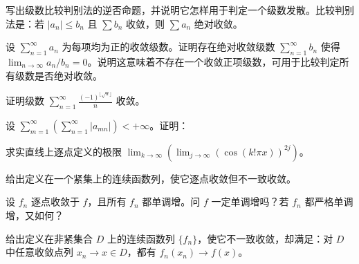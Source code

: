 \noindent\begin{minipage}{\textwidth}
写出级数比较判别法的逆否命题，并说明它怎样用于判定一个级数发散。比较判别法是：若 $|a_n|\le b_n$ 且 $\sum b_n$ 收敛，则 $\sum a_n$ 绝对收敛。
\end{minipage}\par\vfill
\noindent\begin{minipage}{\textwidth}
设 $\sum_{n=1}^{\infty}a_n$ 为每项均为正的收敛级数。证明存在绝对收敛级数 $\sum_{n=1}^{\infty}b_n$ 使得 $\lim_{n\to\infty}a_n/b_n=0$。说明这意味着不存在一个收敛正项级数，可用于比较判定所有级数是否绝对收敛。
\end{minipage}\par\vfill
\newpage
\noindent\begin{minipage}{\textwidth}
证明级数 $\displaystyle\sum_{n=1}^{\infty}\frac{(-1)^{\lfloor\sqrt n\rfloor}}n$ 收敛。
\end{minipage}\par\vfill
\noindent\begin{minipage}{\textwidth}
设 $\displaystyle\sum_{m=1}^{\infty}\left(\sum_{n=1}^{\infty}|a_{mn}|\right)<+\infty$。证明：
\end{minipage}\par\vfill
\noindent\begin{minipage}{\textwidth}
求实直线上逐点定义的极限 $\displaystyle\lim_{k\to\infty}\left(\lim_{j\to\infty}(\cos(k!\pi x))^{2j}\right)$。
\end{minipage}\par\vfill
\noindent\begin{minipage}{\textwidth}
给出定义在一个紧集上的连续函数列，使它逐点收敛但不一致收敛。
\end{minipage}\par\vfill
\newpage
\noindent\begin{minipage}{\textwidth}
设 $f_n$ 逐点收敛于 $f$，且所有 $f_n$ 都单调增。问 $f$ 一定单调增吗？若 $f_n$ 都严格单调增，又如何？
\end{minipage}\par\vfill
\noindent\begin{minipage}{\textwidth}
给出定义在非紧集合 $D$ 上的连续函数列 $\{f_n\}$，使它不一致收敛，却满足：对 $D$ 中任意收敛点列 $x_n\to x\in D$，都有 $f_n(x_n)\to f(x)$。
\end{minipage}\par\vfill
